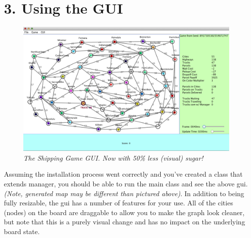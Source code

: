 \documentclass[11pt]{article}
\begin{document}
\section{3. Using the GUI}
\begin{figure}[h]
\centerline{\includegraphics[scale=0.45]{gui.png}} 
\caption{\em{The Shipping Game GUI. Now with 50\% less (visual) sugar!}}
\end{figure}

Assuming the installation process went correctly and you've created a class that extends manager, you should be able to run the main class and see the above gui. {\em(Note, generated map may be different than pictured above)}. In addition to being fully resizable, the gui has a number of features for your use. All of the cities (nodes) on the board are draggable to allow you to make the graph look cleaner, but note that this is a purely visual change and has no impact on the underlying board state.
\end{document}
